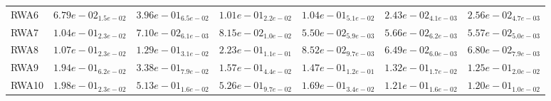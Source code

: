\documentclass{article}
\begin{document}
\begin{table}
\begin{scriptsize}
\begin{tabular}{lllllll}
RWA6 & $  6.79e-02_{ 1.5e-02}$ & $  3.96e-01_{ 6.5e-02}$ & $  1.01e-01_{ 2.2e-02}$ & $  1.04e-01_{ 5.1e-02}$ & \cellcolor{gray95}$  2.43e-02_{ 4.1e-03}$ & \cellcolor{gray25}$  2.56e-02_{ 4.7e-03}$ \\
RWA7 & $  1.04e-01_{ 2.3e-02}$ & $  7.10e-02_{ 6.1e-03}$ & $  8.15e-02_{ 1.0e-02}$ & \cellcolor{gray95}$  5.50e-02_{ 5.9e-03}$ & $  5.66e-02_{ 6.2e-03}$ & \cellcolor{gray25}$  5.57e-02_{ 5.0e-03}$ \\
RWA8 & $  1.07e-01_{ 2.3e-02}$ & $  1.29e-01_{ 3.1e-02}$ & $  2.23e-01_{ 1.1e-01}$ & $  8.52e-02_{ 9.7e-03}$ & \cellcolor{gray95}$  6.49e-02_{ 6.0e-03}$ & \cellcolor{gray25}$  6.80e-02_{ 7.9e-03}$ \\
RWA9 & $  1.94e-01_{ 6.2e-02}$ & $  3.38e-01_{ 7.9e-02}$ & $  1.57e-01_{ 4.4e-02}$ & $  1.47e-01_{ 1.2e-01}$ & \cellcolor{gray25}$  1.32e-01_{ 1.7e-02}$ & \cellcolor{gray95}$  1.25e-01_{ 2.0e-02}$ \\
RWA10 & $  1.98e-01_{ 2.3e-02}$ & $  5.13e-01_{ 1.6e-02}$ & $  5.26e-01_{ 9.7e-02}$ & $  1.69e-01_{ 3.4e-02}$ & \cellcolor{gray25}$  1.21e-01_{ 1.6e-02}$ & \cellcolor{gray95}$  1.20e-01_{ 1.0e-02}$ \\
\hline
\end{tabular}
\end{scriptsize}
\end{table}
\end{document}
